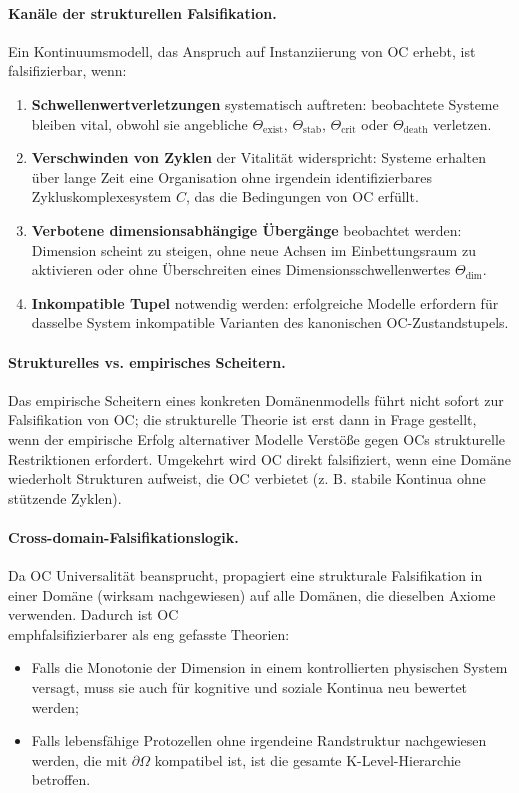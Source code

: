 \paragraph{Kanäle der strukturellen Falsifikation.}
Ein Kontinuumsmodell, das Anspruch auf Instanziierung von OC erhebt, ist falsifizierbar, wenn:
\begin{enumerate}
  \item \textbf{Schwellenwertverletzungen} systematisch auftreten:
        beobachtete Systeme bleiben vital, obwohl sie angebliche
        \(\Theta_{\mathrm{exist}}\), \(\Theta_{\mathrm{stab}}\),
        \(\Theta_{\mathrm{crit}}\) oder \(\Theta_{\mathrm{death}}\) verletzen.
  \item \textbf{Verschwinden von Zyklen} der Vitalität widerspricht:
        Systeme erhalten über lange Zeit eine Organisation ohne irgendein
        identifizierbares Zykluskomplexesystem \(C\), das die Bedingungen von OC erfüllt.
  \item \textbf{Verbotene dimensionsabhängige Übergänge} beobachtet werden:
        Dimension scheint zu steigen, ohne neue Achsen im Einbettungsraum
        zu aktivieren oder ohne Überschreiten eines Dimensionsschwellenwertes
        \(\Theta_{\mathrm{dim}}\).
  \item \textbf{Inkompatible Tupel} notwendig werden:
        erfolgreiche Modelle erfordern für dasselbe System inkompatible Varianten
        des kanonischen OC-Zustandstupels.
\end{enumerate}

\paragraph{Strukturelles vs. empirisches Scheitern.}
Das empirische Scheitern eines konkreten Domänenmodells führt nicht sofort zur Falsifikation von OC;
die strukturelle Theorie ist erst dann in Frage gestellt, wenn der empirische Erfolg
alternativer Modelle Verstöße gegen OCs strukturelle Restriktionen erfordert.
Umgekehrt wird OC direkt falsifiziert, wenn eine Domäne wiederholt Strukturen aufweist,
die OC verbietet (z. B. stabile Kontinua ohne stützende Zyklen).

\paragraph{Cross-domain-Falsifikationslogik.}
Da OC Universalität beansprucht, propagiert eine strukturale Falsifikation in einer Domäne
(wirksam nachgewiesen) auf alle Domänen, die dieselben Axiome verwenden.
Dadurch ist OC \\emph{falsifizierbarer} als eng gefasste Theorien:
\begin{itemize}
  \item Falls die Monotonie der Dimension in einem kontrollierten physischen System versagt,
muss sie auch für kognitive und soziale Kontinua neu bewertet werden;
  \item Falls lebensfähige Protozellen ohne irgendeine Randstruktur nachgewiesen werden,
die mit \(\partial\Omega\) kompatibel ist, ist die gesamte K-Level-Hierarchie betroffen.
\end{itemize}

